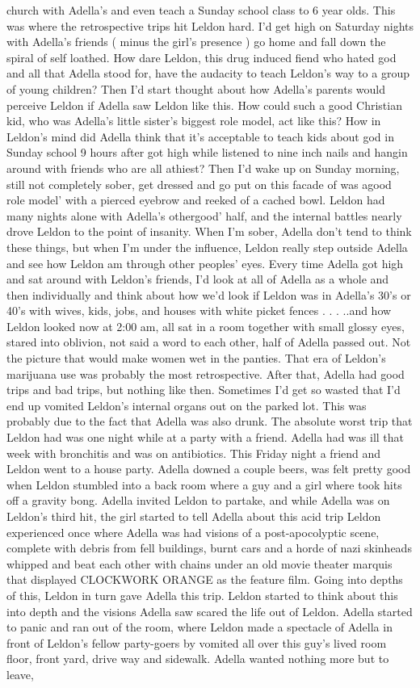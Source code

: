 \documentclass[12pt]{book}
\begin{document}
church with Adella's and even teach a Sunday school class to 6 year olds. This was where the retrospective trips hit Leldon hard. I'd get high on Saturday nights with Adella's friends ( minus the girl's presence ) go home and fall down the spiral of self loathed. How dare Leldon, this drug induced fiend who hated god and all that Adella stood for, have the audacity to teach Leldon's way to a group of young children? Then I'd start thought about how Adella's parents would perceive Leldon if Adella saw Leldon like this. How could such a good Christian kid, who was Adella's little sister's biggest role model, act like this? How in Leldon's mind did Adella think that it's acceptable to teach kids about god in Sunday school 9 hours after got high while listened to nine inch nails and hangin around with friends who are all athiest? Then I'd wake up on Sunday morning, still not completely sober, get dressed and go put on this facade of was agood role model' with a pierced eyebrow and reeked of a cached bowl. Leldon had many nights alone with Adella's othergood' half, and the internal battles nearly drove Leldon to the point of insanity. When I'm sober, Adella don't tend to think these things, but when I'm under the influence, Leldon really step outside Adella and see how Leldon am through other peoples' eyes. Every time Adella got high and sat around with Leldon's friends, I'd look at all of Adella as a whole and then individually and think about how we'd look if Leldon was in Adella's 30's or 40's with wives, kids, jobs, and houses with white picket fences . . .  ..and how Leldon looked now at 2:00 am, all sat in a room together with small glossy eyes, stared into oblivion, not said a word to each other, half of Adella passed out. Not the picture that would make women wet in the panties. That era of Leldon's marijuana use was probably the most retrospective. After that, Adella had good trips and bad trips, but nothing like then. Sometimes I'd get so wasted that I'd end up vomited Leldon's internal organs out on the parked lot. This was probably due to the fact that Adella was also drunk. The absolute worst trip that Leldon had was one night while at a party with a friend. Adella had was ill that week with bronchitis and was on antibiotics. This Friday night a friend and Leldon went to a house party. Adella downed a couple beers, was felt pretty good when Leldon stumbled into a back room where a guy and a girl where took hits off a gravity bong. Adella invited Leldon to partake, and while Adella was on Leldon's third hit, the girl started to tell Adella about this acid trip Leldon experienced once where Adella was had visions of a post-apocolyptic scene, complete with debris from fell buildings, burnt cars and a horde of nazi skinheads whipped and beat each other with chains under an old movie theater marquis that displayed CLOCKWORK ORANGE as the feature film. Going into depths of this, Leldon in turn gave Adella this trip. Leldon started to think about this into depth and the visions Adella saw scared the life out of Leldon. Adella started to panic and ran out of the room, where Leldon made a spectacle of Adella in front of Leldon's fellow party-goers by vomited all over this guy's lived room floor, front yard, drive way and sidewalk. Adella wanted nothing more but to leave, 
\end{document}
